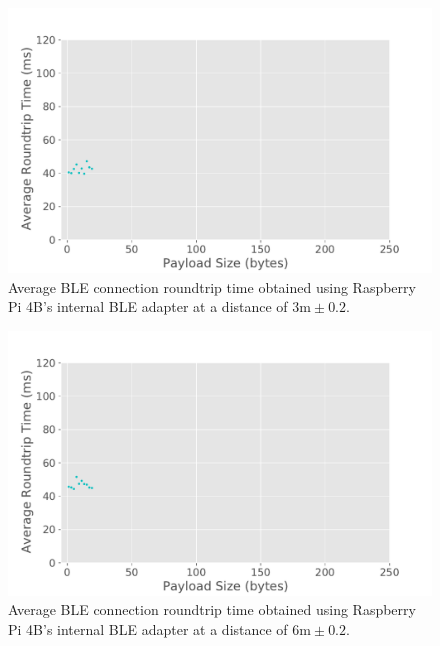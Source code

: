 \begin{figure}[H]
    \centering
    \includegraphics[width=0.75\linewidth]{images/ble-roundtrip-hci1-300cm.pdf}
    \caption[Average \acs{BLE} connection roundtrip time obtained using Raspberry Pi 4B's internal \acs{BLE} adapter at a distance of 3m.]{Average \acs{BLE} connection roundtrip time obtained using Raspberry Pi 4B's internal \acs{BLE} adapter at a distance of $3\text{m} \pm 0.2$.}
    \label{fig:ble-roundtrip-hci1-3m}
\end{figure}

\begin{figure}[H]
    \centering
    \includegraphics[width=0.75\linewidth]{images/ble-roundtrip-hci1-600cm.pdf}
    \caption[Average \acs{BLE} connection roundtrip time obtained using Raspberry Pi 4B's internal \acs{BLE} adapter at a distance of 6m.]{Average \acs{BLE} connection roundtrip time obtained using Raspberry Pi 4B's internal \acs{BLE} adapter at a distance of $6\text{m} \pm 0.2$.}
    \label{fig:ble-roundtrip-hci1-6m}
\end{figure}

